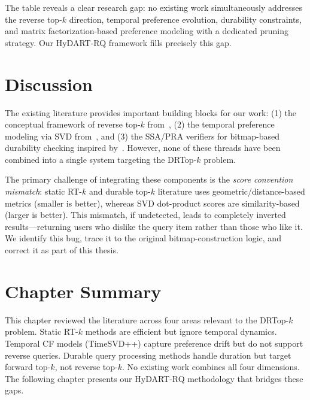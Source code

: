 The table reveals a clear research gap: no existing work simultaneously addresses the reverse top-$k$ direction, temporal preference evolution, durability constraints, and matrix factorization-based preference modeling with a dedicated pruning strategy. Our HyDART-RQ framework fills precisely this gap.

\section{Discussion}

The existing literature provides important building blocks for our work: (1) the conceptual framework of reverse top-$k$ from~\cite{vlachou2010reverse}, (2) the temporal preference modeling via SVD from~\cite{koren2009matrix,koren2009temporal}, and (3) the SSA/PRA verifiers for bitmap-based durability checking inspired by~\cite{mouratidis2006continuous}. However, none of these threads have been combined into a single system targeting the DRTop-$k$ problem.

The primary challenge of integrating these components is the \textit{score convention mismatch}: static RT-$k$ and durable top-$k$ literature uses geometric/distance-based metrics (smaller is better), whereas SVD dot-product scores are similarity-based (larger is better). This mismatch, if undetected, leads to completely inverted results---returning users who dislike the query item rather than those who like it. We identify this bug, trace it to the original bitmap-construction logic, and correct it as part of this thesis.

\section{Chapter Summary}

This chapter reviewed the literature across four areas relevant to the DRTop-$k$ problem. Static RT-$k$ methods are efficient but ignore temporal dynamics. Temporal CF models (TimeSVD++) capture preference drift but do not support reverse queries. Durable query processing methods handle duration but target forward top-$k$, not reverse top-$k$. No existing work combines all four dimensions. The following chapter presents our HyDART-RQ methodology that bridges these gaps.

